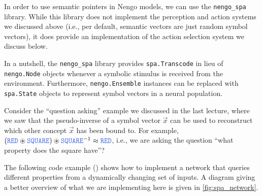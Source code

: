 \documentclass[10pt,letterpaper,oneside]{article}
\newcommand{\Obj}[1]{\ensuremath{\mathtt{\textcolor{RoyalBlue}{#1}}}}
\newcommand{\CC}{\circledast}
\begin{document}
In order to use semantic pointers in Nengo models, we can use the \texttt{nengo\_spa} library. While this library does not implement the perception and action systems we discussed above (i.e., per default, semantic vectors are just random symbol vectors), it does provide an implementation of the action selection system we discuss below.

In a nutshell, the \texttt{nengo\_spa} library provides \texttt{spa.Transcode} in lieu of \texttt{nengo.Node} objects whenever a symbolic stimulus is received from the environment. Furthermore, \texttt{nengo.Ensemble} instances can be replaced with \texttt{spa.State} objects to represent symbol vectors in a neural population.

Consider the \enquote{question asking} example we discussed in the last lecture, where we saw that the pseudo-inverse of a symbol vector $\vec x$ can be used to reconstruct which other concept $\vec x$ has been bound to. For example, $(\Obj{RED} \CC \Obj{SQUARE}) \CC \Obj{SQUARE}^{-1} \approx \Obj{RED}$, i.e., we are asking the question \enquote{what property does the square have}?

The following code example () shows how to implement a network that queries different properties from a dynamically changing set of inputs. A diagram giving a better overview of what we are implementing here is given in \cref{fig:spa_network}.
\pagebreak\vspace*{-0.75cm}
\cprotect{}
\end{document}
